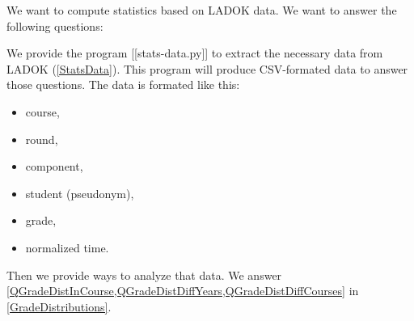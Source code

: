 We want to compute statistics based on LADOK data.
We want to answer the following questions:

We provide the program [[stats-data.py]] to extract the necessary data from 
LADOK (\cref{StatsData}).
This program will produce CSV-formated data to answer those questions.
The data is formated like this:
\begin{itemize}
\item course,
\item round,
\item component,
\item student (pseudonym),
\item grade,
\item normalized time.
\end{itemize}

Then we provide ways to analyze that data.
We answer
\cref{QGradeDistInCourse,QGradeDistDiffYears,QGradeDistDiffCourses}
in \cref{GradeDistributions}.



